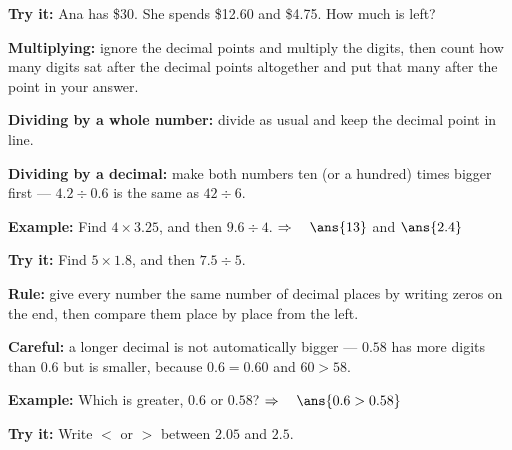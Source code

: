 \documentclass[12pt]{article}
\begin{document}
\begin{tryitbox}
\textbf{Try it:} Ana has \$30. She spends \$12.60 and \$4.75. How much is left?\\[2pt]
\end{tryitbox}


\begin{formulabox}
\textbf{Multiplying:} ignore the decimal points and multiply the digits, then count
how many digits sat after the decimal points altogether and put that many after the
point in your answer.\par
\textbf{Dividing by a whole number:} divide as usual and keep the decimal point in
line.\par
\textbf{Dividing by a decimal:} make both numbers ten (or a hundred) times bigger
first --- $4.2 \div 0.6$ is the same as $42 \div 6$.
\end{formulabox}

\begin{examplebox}
\textbf{Example:} Find $4 \times 3.25$, and then $9.6 \div 4$.
$\Rightarrow\quad \ans{13}$ and $\ans{2.4}$
\end{examplebox}

\begin{tryitbox}
\textbf{Try it:} Find $5 \times 1.8$, and then $7.5 \div 5$.\\[2pt]
\end{tryitbox}


\begin{formulabox}
\textbf{Rule:} give every number the same number of decimal places by writing zeros
on the end, then compare them place by place from the left.\par
\textbf{Careful:} a longer decimal is not automatically bigger --- $0.58$ has more
digits than $0.6$ but is smaller, because $0.6 = 0.60$ and $60 > 58$.
\end{formulabox}

\begin{examplebox}
\textbf{Example:} Which is greater, $0.6$ or $0.58$?
$\Rightarrow\quad \ans{0.6 > 0.58}$
\end{examplebox}

\begin{tryitbox}
\textbf{Try it:} Write $<$ or $>$ between $2.05$ and $2.5$.\\[2pt]
\end{tryitbox}
\end{document}
